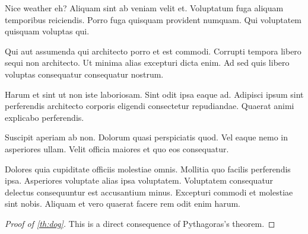 \documentclass[10pt, final]{book}
\begin{document}
Nice weather eh? Aliquam sint ab veniam velit et. Voluptatum fuga aliquam temporibus reiciendis. Porro fuga quisquam provident numquam. Qui voluptatem quisquam voluptas qui.

Qui aut assumenda qui architecto porro et est commodi. Corrupti tempora libero sequi non architecto. Ut minima alias excepturi dicta enim. Ad sed quis libero voluptas consequatur consequatur nostrum.

Harum et sint ut non iste laboriosam. Sint odit ipsa eaque ad. Adipisci ipsum sint perferendis architecto corporis eligendi consectetur repudiandae. Quaerat animi explicabo perferendis.

Suscipit aperiam ab non. Dolorum quasi perspiciatis quod. Vel eaque nemo in asperiores ullam. Velit officia maiores et quo eos consequatur.

Dolores quia cupiditate officiis molestiae omnis. Mollitia quo facilis perferendis ipsa. Asperiores voluptate alias ipsa voluptatem. Voluptatem consequatur delectus consequuntur est accusantium minus. Excepturi commodi et molestiae sint nobis. Aliquam et vero quaerat facere rem odit enim harum.


\begin{proof} [Proof of \ref{th:dog}]
    This is a direct consequence of Pythagoras's theorem.
\end{proof}

\nocite{*}



\printindex
\end{document}
